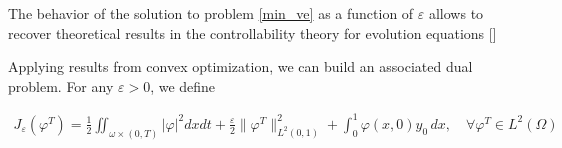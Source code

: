 The behavior of the solution to problem \eqref{min_ve} as a function of $\varepsilon$ allows to recover theoretical results in the controllability theory for evolution equations []

Applying results from convex optimization, we can build an associated dual problem. For any $\varepsilon>0$, we define

\begin{align*}
	J_\varepsilon(\varphi^T)=\frac{1}{2}\iint_{\omega\times(0,T)}|\varphi|^2dxdt+\frac{\varepsilon}{2}\|\varphi^T\|^2_{L^2(0,1)}+\int_{0}^{1}\varphi(x,0)y_0\,dx, \quad \forall \varphi^T\in L^2(\Omega)
\end{align*}

